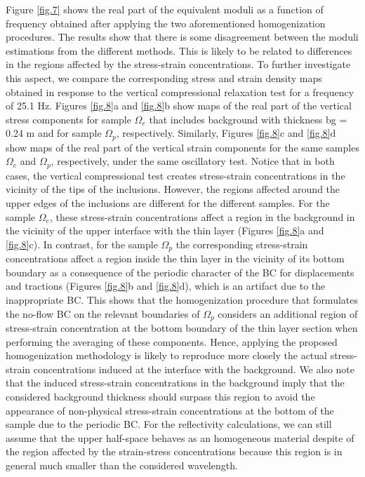 \documentclass[draft]{agujournal2019}
\begin{document}
Figure \ref{fig.7} shows the real part of the  equivalent moduli as a function of frequency obtained after applying the two aforementioned homogenization procedures.
The results show that there is some disagreement between the moduli estimations from the different methods.
This is likely to be related to differences in the regions affected by the stress-strain concentrations. To further investigate this aspect, we compare the corresponding stress and strain density maps obtained in response to the vertical compressional relaxation test for a frequency of 25.1 Hz. Figures \ref{fig.8}a and \ref{fig.8}b show maps of the real part of the vertical stress components for sample $\Omega_e$ that includes background with thickness bg = 0.24 m and for  sample $\Omega_p$, respectively. Similarly, Figures \ref{fig.8}c and \ref{fig.8}d show maps of the real part of the vertical strain components for the same samples  $\Omega_e$ and $\Omega_p$, respectively, under the same oscillatory test. Notice that in both cases, the vertical compressional test creates stress-strain concentrations in the vicinity of the tips of the inclusions. However, the regions affected around the upper edges of the inclusions are different for the different samples. For the sample $\Omega_e$, these stress-strain concentrations affect a region in the background in the vicinity of the upper interface with the thin layer (Figures \ref{fig.8}a and \ref{fig.8}c). In contrast, for the sample $\Omega_p$  the corresponding stress-strain concentrations affect a region inside the thin layer in the vicinity of its bottom boundary as a consequence of the periodic character of the BC for displacements and tractions (Figures \ref{fig.8}b and \ref{fig.8}d), which is an artifact due to the inappropriate BC. This shows that the homogenization procedure that formulates the no-flow BC on the relevant boundaries of $\Omega_p$ considers an additional region of stress-strain concentration at the bottom boundary of the thin layer section when performing the averaging of these components. Hence, applying the proposed homogenization methodology is likely to reproduce more closely the actual stress-strain concentrations induced at the interface with the background. We also note that the induced stress-strain concentrations in the background imply that the considered background thickness should surpass this region to avoid the appearance of non-physical stress-strain concentrations at the bottom of the sample due to the periodic BC. For the reflectivity calculations, we can still assume that the upper half-space behaves as an homogeneous material despite of the region affected by the strain-stress concentrations because this region is in general much smaller than the considered wavelength. 
\end{document}
